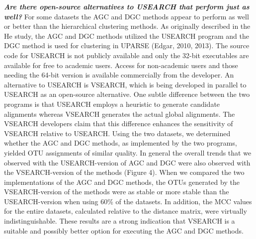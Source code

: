 \documentclass[11pt,]{article}
\begin{document}
\textbf{\emph{Are there open-source alternatives to USEARCH that perform
just as well?}} For some datasets the AGC and DGC methods appear to
perform as well or better than the hierarchical clustering methods. As
originally described in the He study, the AGC and DGC methods utilized
the USEARCH program and the DGC method is used for clustering in UPARSE
(Edgar, 2010, 2013). The source code for USEARCH is not publicly
available and only the 32-bit executables are available for free to
academic users. Access for non-academic users and those needing the
64-bit version is available commercially from the developer. An
alternative to USEARCH is VSEARCH, which is being developed in parallel
to USEARCH as an open-source alternative. One subtle difference between
the two programs is that USEARCH employs a heuristic to generate
candidate alignments whereas VSEARCH generates the actual global
alignments. The VSEARCH developers claim that this difference enhances
the sensitivity of VSEARCH relative to USEARCH. Using the two datasets,
we determined whether the AGC and DGC methods, as implemented by the two
programs, yielded OTU assignments of similar quality. In general the
overall trends that we observed with the USEARCH-version of AGC and DGC
were also observed with the VSEARCH-version of the methods (Figure 4).
When we compared the two implementations of the AGC and DGC methods, the
OTUs generated by the VSEARCH-version of the methods were as stable or
more stable than the USEARCH-version when using 60\% of the datasets. In
addition, the MCC values for the entire datasets, calculated relative to
the distance matrix, were virtually indistinguishable. These results are
a strong indication that VSEARCH is a suitable and possibly better
option for executing the AGC and DGC methods.
\end{document}
